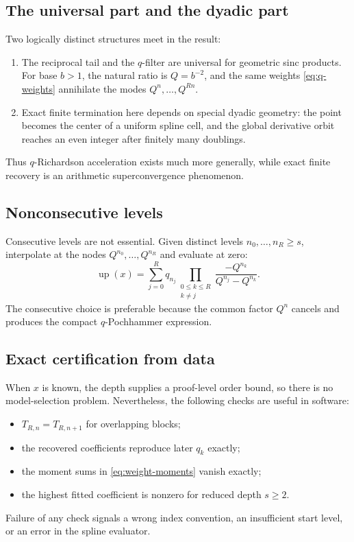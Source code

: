 \documentclass[11pt]{article}
\theoremstyle{definition}
\theoremstyle{remark}
\newcommand{\rv}{\operatorname{up}}
\begin{document}
\subsection{The universal part and the dyadic part}

Two logically distinct structures meet in the result:
\begin{enumerate}[label=(\roman*),leftmargin=2.2em]
 \item The reciprocal tail and the \(q\)-filter are universal for geometric
       sinc products.  For base \(b>1\), the natural ratio is \(Q=b^{-2}\),
       and the same weights \cref{eq:q-weights} annihilate the modes
       \(Q^n,\ldots,Q^{Rn}\).
 \item Exact finite termination here depends on special dyadic geometry:
       the point becomes the center of a uniform spline cell, and the global
       derivative orbit reaches an even integer after finitely many doublings.
\end{enumerate}
Thus \(q\)-Richardson acceleration exists much more generally, while exact
finite recovery is an arithmetic superconvergence phenomenon.

\subsection{Nonconsecutive levels}

Consecutive levels are not essential.  Given distinct levels
\(n_0,\ldots,n_R\ge s\), interpolate at the nodes
\(Q^{n_0},\ldots,Q^{n_R}\) and evaluate at zero:
\begin{equation}
 \rv(x)=\sum_{j=0}^{R}q_{n_j}
 \prod_{\substack{0\le k\le R\\k\ne j}}
 \frac{-Q^{n_k}}{Q^{n_j}-Q^{n_k}}.
 \label{eq:nonconsecutive}
\end{equation}
The consecutive choice is preferable because the common factor \(Q^n\)
cancels and produces the compact \(q\)-Pochhammer expression.

\subsection{Exact certification from data}

When \(x\) is known, the depth supplies a proof-level order bound, so there is
no model-selection problem.  Nevertheless, the following checks are useful in
software:
\begin{itemize}[leftmargin=2em]
 \item \(T_{R,n}=T_{R,n+1}\) for overlapping blocks;
 \item the recovered coefficients reproduce later \(q_k\) exactly;
 \item the moment sums in \cref{eq:weight-moments} vanish exactly;
 \item the highest fitted coefficient is nonzero for reduced depth \(s\ge2\).
\end{itemize}
Failure of any check signals a wrong index convention, an insufficient start
level, or an error in the spline evaluator.
\end{document}

